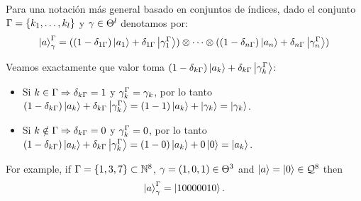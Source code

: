 \begin{notation}
	Para una notación más general basado en conjuntos de índices, dado el conjunto $\Gamma=\{k_1,\dots,k_l\}$ y $\gamma\in\Theta^l$ denotamos por:
	\[
		\ket{a}^{\Gamma}_{\gamma}=((1-\delta_{1\Gamma})\ket{a_1}+\delta_{1\Gamma}\ket{{\gamma}^{\Gamma}_1})\otimes\dots\otimes ((1-\delta_{n\Gamma})\ket{a_n}+\delta_{n\Gamma}\ket{{\gamma}^{\Gamma}_n})
	\]
\end{notation}

Veamos exactamente que valor toma $(1-\delta_{k\Gamma})\ket{a_k}+\delta_{k\Gamma}\ket{{\gamma}^{\Gamma}_k}$:
\begin{itemize}
	\item Si $k\in\Gamma\Rightarrow\delta_{k\Gamma}=1$ y ${\gamma}^{\Gamma}_k=\gamma_k$, por lo tanto $(1-\delta_{k\Gamma})\ket{a_k}+\delta_{k\Gamma}\ket{{\gamma}^{\Gamma}_k}=(1-1)\ket{a_k}+\ket{\gamma_k}=\ket{\gamma_k}$.
	\item Si $k\notin\Gamma\Rightarrow\delta_{k\Gamma}=0$ y ${\gamma}^{\Gamma}_k=0$, por lo tanto $(1-\delta_{k\Gamma})\ket{a_k}+\delta_{k\Gamma}\ket{{\gamma}^{\Gamma}_k}=(1-0)\ket{a_k}+0\ket{0}=\ket{a_k}$.
\end{itemize}

For example, if $\Gamma=\{1,3,7\}\subset \mathbb{N}^8$, $\gamma=(1,0,1)\in\Theta^3$ and $\ket{a}=\ket{0}\in\mathcal{Q}^8$ then
\[
	\ket{a}^{\Gamma}_{\gamma}=\ket{10000010}.
\]
